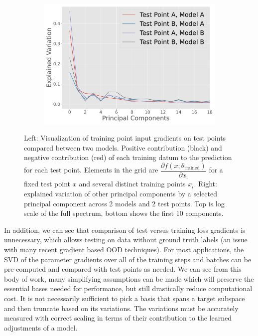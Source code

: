 \begin{figure}[t]
\begin{center}
\begin{subfigure}{0.46\textwidth}
\includegraphics[width=\textwidth]{c4a_figures/related_spectra_narrow_view.pdf}
\end{subfigure}
\end{center}
\caption{Left: Visualization of training point input gradients on test points compared between two models. Positive contribution (black) and negative contribution (red) of each training datum to the prediction for each test point. Elements in the grid are $\dfrac{\partial f(x; \theta_{\text{trained}})}{\partial x_{\text{i}}}$ for a fixed test point $x$ and several distinct training points $x_i$. Right: explained variation of other principal components by a selected principal component across 2 models and 2 test points. Top is log scale of the full spectrum, bottom shows the first 10 components.}
\label{fig:trans}
\end{figure}

In addition, we can see that comparison of test versus training loss gradients is unnecessary, which allows testing on data without ground truth labels (an issue with many recent gradient based OOD techniques). 
For most applications, the SVD of the parameter gradients over all of
the training steps and batches can be pre-computed and compared with
test points as needed. We can see from this body of work, many simplifying assumptions can be made which will preserve the essential bases needed for performance, but still drastically reduce computational cost. It is not necessarily sufficient to pick a basis that spans a target subspace and then truncate based on its variations. The variations must be accurately measured with correct scaling in terms of their contribution to the learned adjustments of a model. %


